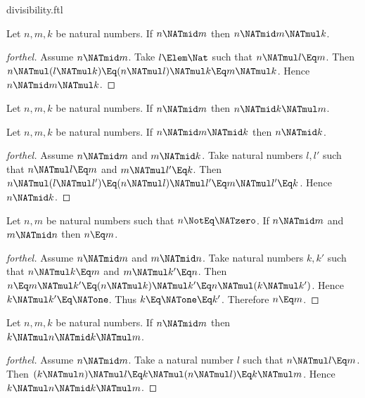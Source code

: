 \documentclass{stex}
\begin{document}
\begin{smodule}{divisibility.ftl}
\begin{proposition}[forthel]
  Let $n, m, k$ be natural numbers.
  If $n \NATmid m$ then $n \NATmid m \NATmul k$.
\end{proposition}
\begin{proof}[forthel]
  Assume $n \NATmid m$.
  Take $l \Elem \Nat$ such that $n \NATmul l \Eq m$.
  Then $n \NATmul (l \NATmul k)
    \Eq (n \NATmul l) \NATmul k
    \Eq m \NATmul k$.
  Hence $n \NATmid m \NATmul k$.
\end{proof}

\begin{corollary}[forthel]
  Let $n, m, k$ be natural numbers.
  If $n \NATmid m$ then $n \NATmid k \NATmul m$.
\end{corollary}

\begin{proposition}[forthel]
  Let $n, m, k$ be natural numbers.
  If $n \NATmid m \NATmid k$ then $n \NATmid k$.
\end{proposition}
\begin{proof}[forthel]
  Assume $n \NATmid m$ and $m \NATmid k$.
  Take natural numbers $l,l'$ such that $n \NATmul l \Eq m$ and $m \NATmul l' \Eq k$.
  Then $n \NATmul (l \NATmul l')
    \Eq (n \NATmul l) \NATmul l'
    \Eq m \NATmul l'
    \Eq k$.
  Hence $n \NATmid k$.
\end{proof}

\begin{proposition}[forthel]
  Let $n, m$ be natural numbers such that $n \NotEq \NATzero$.
  If $n \NATmid m$ and $m \NATmid n$ then $n \Eq m$.
\end{proposition}
\begin{proof}[forthel]
  Assume $n \NATmid m$ and $m \NATmid n$.
  Take natural numbers $k,k'$ such that $n \NATmul k \Eq m$ and $m \NATmul k' \Eq n$.
  Then $n
    \Eq m \NATmul k'
    \Eq (n \NATmul k) \NATmul k'
    \Eq n \NATmul (k \NATmul k')$.
  Hence $k \NATmul k' \Eq \NATone$.
  Thus $k \Eq \NATone \Eq k'$.
  Therefore $n \Eq m$.
\end{proof}

\begin{proposition}[forthel]
  Let $n, m, k$ be natural numbers.
  If $n \NATmid m$ then $k \NATmul n \NATmid k \NATmul m$.
\end{proposition}
\begin{proof}[forthel]
  Assume $n \NATmid m$.
  Take a natural number $l$ such that $n \NATmul l \Eq m$.
  Then $(k \NATmul n) \NATmul l
    \Eq k \NATmul (n \NATmul l)
    \Eq k \NATmul m$.
  Hence $k \NATmul n \NATmid k \NATmul m$.
\end{proof}


\end{smodule}
\end{document}
